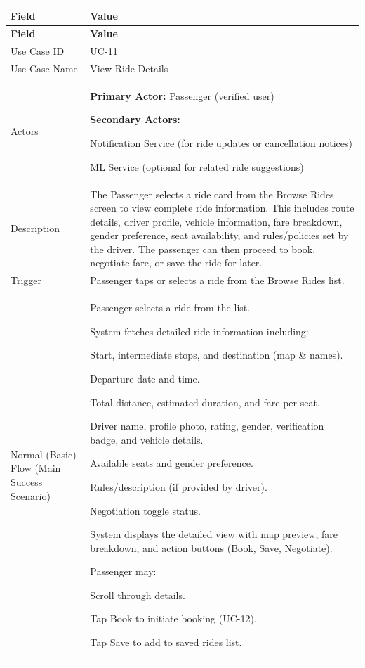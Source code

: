 \begin{longtable}{|p{3.5cm}|p{12cm}|}
\hline
\rowcolor{lightgray!30}
\textbf{Field} & \textbf{Value} \\
\hline
\endfirsthead
\hline
\rowcolor{lightgray!30}
\textbf{Field} & \textbf{Value} \\
\hline
\endhead
\hline
\endfoot
Use Case ID & UC-11 \\
\hline
Use Case Name & View Ride Details \\
\hline
Actors &
\textbf{Primary Actor:} Passenger (verified user)

\textbf{Secondary Actors:}

Notification Service (for ride updates or cancellation notices)

ML Service (optional for related ride suggestions) \\
\hline
Description &
The Passenger selects a ride card from the Browse Rides screen to view complete ride information. This includes route details, driver profile, vehicle information, fare breakdown, gender preference, seat availability, and rules/policies set by the driver. The passenger can then proceed to book, negotiate fare, or save the ride for later. \\
\hline
Trigger &
Passenger taps or selects a ride from the Browse Rides list. \\
\hline
Normal (Basic) Flow (Main Success Scenario) &
Passenger selects a ride from the list.

System fetches detailed ride information including:

Start, intermediate stops, and destination (map \& names).

Departure date and time.

Total distance, estimated duration, and fare per seat.

Driver name, profile photo, rating, gender, verification badge, and vehicle details.

Available seats and gender preference.

Rules/description (if provided by driver).

Negotiation toggle status.

System displays the detailed view with map preview, fare breakdown, and action buttons (Book, Save, Negotiate).

Passenger may:

Scroll through details.

Tap Book to initiate booking (UC-12).

Tap Save to add to saved rides list.


\end{longtable}
